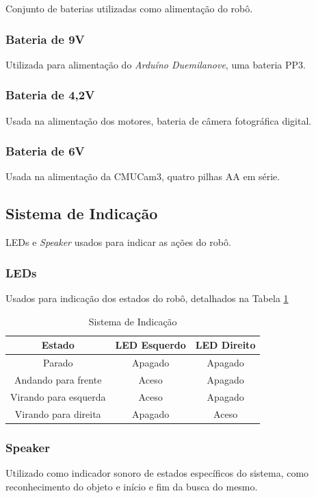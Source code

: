 Conjunto de baterias utilizadas como alimentação do robô.

\subsubsection{Bateria de 9V}
Utilizada para alimentação do \textit{Arduíno Duemilanove}, uma bateria PP3.

\subsubsection{Bateria de 4,2V}
Usada na alimentação dos motores, bateria de câmera fotográfica digital.

\subsubsection{Bateria de 6V}
Usada na alimentação da CMUCam3, quatro pilhas AA em série.

\subsection{Sistema de Indicação}

LEDs e \textit{Speaker} usados para indicar as ações do robô.

\subsubsection{LEDs}
Usados para indicação dos estados do robô, detalhados na Tabela \ref{int_tbl01}

\begin{table}[h!]
    \centering
    \begin{tabular}{|c|c|c|} \hline
        \textbf{Estado} & \textbf{LED Esquerdo} & \textbf{LED Direito} \\ \hline
        Parado & Apagado & Apagado \\ \hline
        Andando para frente & Aceso & Apagado \\ \hline
        Virando para esquerda & Aceso & Apagado \\ \hline
        Virando para direita & Apagado & Aceso \\ \hline
    \end{tabular}
    \caption{Sistema de Indicação}
    \label{int_tbl01}
\end{table}

\subsubsection{Speaker}
Utilizado como indicador sonoro de estados específicos do sistema, como reconhecimento do objeto e início e fim da busca do mesmo.

